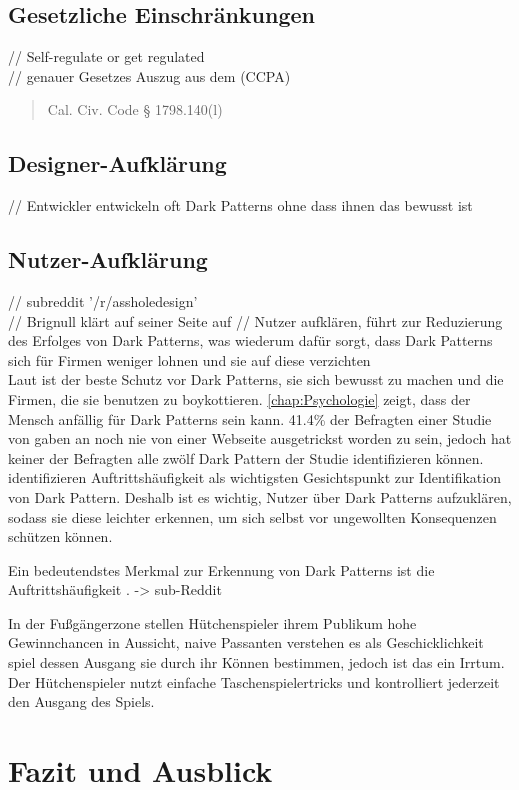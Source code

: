 \documentclass[conference,compsoc,final,a4paper]{IEEEtran}
\begin{document}
\subsection{Gesetzliche Einschränkungen}
// Self-regulate or get regulated
\\// genauer Gesetzes Auszug aus dem (CCPA) \begin{quotation}Cal. Civ. Code § 1798.140(l)\end{quotation}
\subsection{Designer-Aufklärung}
// Entwickler entwickeln oft Dark Patterns ohne dass ihnen das bewusst ist
\subsection{Nutzer-Aufklärung}
// subreddit '/r/assholedesign' \autocite{Chivukula_2019}\\
// Brignull klärt auf seiner Seite auf \autocite{Brignull}
// Nutzer aufklären, führt zur Reduzierung des Erfolges von Dark Patterns, was wiederum dafür sorgt, dass Dark Patterns sich für Firmen weniger lohnen und sie auf diese verzichten\\
Laut \citeauthor{Brignull} \autocite{Brignull} ist der beste Schutz vor Dark Patterns, sie sich bewusst zu machen und die Firmen, die sie benutzen zu boykottieren. \autoref{chap:Psychologie} zeigt, dass der Mensch anfällig für Dark Patterns sein kann. 41.4\% der Befragten einer Studie von \citeauthor{M.Bhoot2020} \autocite{M.Bhoot2020} gaben an noch nie von einer Webseite ausgetrickst worden zu sein, jedoch hat keiner der Befragten alle zwölf Dark Pattern der Studie identifizieren können. \citeauthor{M.Bhoot2020} identifizieren Auftrittshäufigkeit als wichtigsten Gesichtspunkt zur Identifikation von Dark Pattern. Deshalb ist es wichtig, Nutzer über Dark Patterns aufzuklären, sodass sie diese leichter erkennen, um sich selbst vor ungewollten Konsequenzen schützen können.

Ein bedeutendstes Merkmal zur Erkennung von Dark Patterns ist die Auftrittshäufigkeit \autocite{M.Bhoot2020}. -> sub-Reddit


In der Fußgängerzone stellen Hütchenspieler ihrem Publikum hohe Gewinnchancen in Aussicht, naive Passanten verstehen es als Geschicklichkeit spiel dessen Ausgang sie durch ihr Können bestimmen, jedoch ist das ein Irrtum. Der Hütchenspieler nutzt einfache Taschenspielertricks und kontrolliert jederzeit den Ausgang des Spiels. 

\section{Fazit und Ausblick}

\printbibliography
\end{document}
